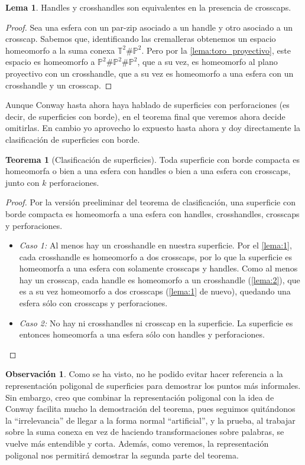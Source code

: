 \documentclass[10pt]{report}
\newcommand{\Toro}{\mathbb{T}^2}
\newcommand{\Proyectivo}{\mathbb{P}^2}
\theoremstyle{definition}
\newtheorem{tma}[defin]{Teorema}
\newtheorem{lema}[defin]{Lema}
\newtheorem{obs}[defin]{Observación}
\begin{document}
\begin{lema}\label{lema:2}
Handles y crosshandles son equivalentes en la presencia de crosscaps.
\end{lema}
\begin{proof}
Sea una esfera con un par-zip asociado a un handle y otro asociado a un crosscap. Sabemos que, identificando las cremalleras obtenemos un espacio homeomorfo a la suma conexa $\Toro \# \Proyectivo$. Pero por la \autoref{lema:toro_proyectivo}, este espacio es homeomorfo a $\Proyectivo \# \Proyectivo \# \Proyectivo$, que a su vez, es homeomorfo al plano proyectivo con un crosshandle, que a su vez es homeomorfo a una esfera con un crosshandle y un crosscap.
\end{proof}
Aunque Conway hasta ahora haya hablado de superficies con perforaciones (es decir, de superficies con borde), en el teorema final que veremos ahora decide omitirlas. En cambio yo aprovecho lo expuesto hasta ahora y doy directamente la clasificación de superficies con borde.
\begin{tma}[Clasificación de superficies]
Toda superficie con borde compacta es homeomorfa o bien a una esfera con handles o bien a una esfera con crosscaps, junto con $k$ perforaciones.
\end{tma}
\begin{proof}
Por la versión preeliminar del teorema de clasificación, una superficie con borde compacta es homeomorfa a una esfera con handles, crosshandles, crosscaps y perforaciones.
\begin{itemize}
\item \textit{Caso 1:} Al menos hay un crosshandle en nuestra superficie. Por el \autoref{lema:1}, cada crosshandle es homeomorfo a dos crosscaps, por lo que la superficie es homeomorfa a una esfera con solamente crosscaps y handles. Como al menos hay un crosscap, cada handle es homeomorfo a un crosshandle (\autoref{lema:2}), que es a su vez homeomorfo a dos crosscaps (\autoref{lema:1} de nuevo), quedando una esfera sólo con crosscaps y perforaciones.
\item \textit{Caso 2:} No hay ni crosshandles ni crosscap en la superficie. La superficie es entonces homeomorfa a una esfera sólo con handles y perforaciones.
\end{itemize}
\end{proof}

\begin{obs}
Como se ha visto, no he podido evitar hacer referencia a la representación poligonal de superficies para demostrar los puntos más informales. Sin embargo, creo que combinar la representación poligonal con la idea de Conway facilita mucho la demostración del teorema, pues seguimos quitándonos la ``irrelevancia'' de llegar a la forma normal ``artificial'', y la prueba,  al trabajar sobre la suma conexa en vez de haciendo transformaciones sobre palabras, se vuelve más entendible y corta. Además, como veremos, la representación poligonal nos permitirá demostrar la segunda parte del teorema.\\
\end{obs}
\end{document}
